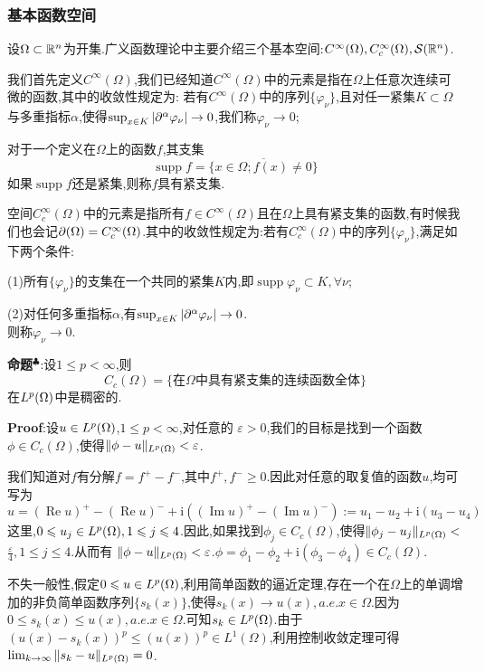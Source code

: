 \subsubsection{基本函数空间}
设$\Omega\subset\mathbb{R} ^n$为开集.广义函数理论中主要介绍三个基本空间:$C^{\infty}(\Omega),C^{\infty}_c(\Omega),\mathcal{S}(\mathbb{R} ^n)$.\par
我们首先定义$C^{\infty}(\Omega)$,我们已经知道$C^{\infty}(\Omega)$中的元素是指在$\Omega$上任意次连续可微的函数,其中的收敛性规定为:
若有$C^{\infty}(\Omega)$中的序列$\{\varphi _{\nu }\}$,且对任一紧集$K\subset \Omega$与多重指标$\alpha$,使得$\sup_{x\in K}|\partial^{\alpha}\varphi _{\nu}|\to 0$,我们称$\varphi _{\nu}\to 0$;\par
对于一个定义在$\Omega$上的函数$f$,其支集
$$
\operatorname{supp}f=\overline{\{x\in \Omega;f(x)\neq 0\}}
$$
如果$\operatorname{supp}f$还是紧集,则称$f$具有紧支集.\par
空间$C^{\infty}_c(\Omega)$中的元素是指所有$f\in C^{\infty}(\Omega)$且在$\Omega$上具有紧支集的函数,有时候我们也会记$\mathcal{\partial}(\Omega)=C^{\infty}_c(\Omega)$.其中的收敛性规定为:若有$C^{\infty}_c(\Omega)$中的序列$\{\varphi _{\nu }\}$,满足如下两个条件:\par
(1)所有$\{\varphi _{\nu}\}$的支集在一个共同的紧集$K$内,即$\operatorname{supp}\varphi _{\nu}\subset K,\forall \nu$;\par
(2)对任何多重指标$\alpha$,有$\sup_{x\in K}|\partial^{\alpha}\varphi _{\nu}|\to 0$.\\
则称$\varphi _{\nu}\to 0$.\par
\textbf{命题}$^\clubsuit $:设$1\leqslant p<\infty$,则
$$
C_{c}(\Omega)=\{\text{在}\Omega\text{中具有紧支集的连续函数全体}\}
$$
在$L^p(\Omega)$中是稠密的.\par
\textbf{Proof}:设$u\in L^p(\Omega)$,$1\leqslant p<\infty$,对任意的 $\varepsilon>0$,我们的目标是找到一个函数$\phi \in C_{c}(\Omega)$,使得$\|\phi-u\|_{L^p(\Omega)}< \varepsilon$.\par
我们知道对$f$有分解$f=f^{+}-f^{-}$,其中$f^{+},f^{-}\geqslant 0$.因此对任意的取复值的函数$u$,均可写为
$$
u=(\operatorname{Re}u)^{+}-(\operatorname{Re}u)^{-}+\mathrm {i}((\operatorname{Im}u)^{+}-(\operatorname{Im}u)^{-}):=u_{1}-u_{2}+\mathrm{i}(u_{3}-u_{4})
$$  
这里,$0\leqslant u_{j}\in L^p(\Omega), 1\leqslant j \leqslant 4$.因此,如果找到$\phi_{j}\in C_{c}( \Omega)$,使得$\|\phi_{j}-u_{j}\|_{ L^p(\Omega)} <$ $\frac{\varepsilon}{4},1\leqslant j\leqslant4$.从而有 $\|\phi-u\|_{L^p(\Omega)}<\varepsilon$.$\phi=\phi_{1}-\phi_{2}+\mathrm{i}(\phi_{3}-\phi_{4})\in C_{c} (\Omega )$.\par
不失一般性,假定$0\leqslant u\in L^p(\Omega)$,利用简单函数的逼近定理,存在一个在$\Omega$上的单调增加的非负简单函数序列$\{s_{k}(x)\}$,使得$s_{k}(x) \to u(x),a.e.x\in\Omega$.因为$0\leqslant s_{k}(x)\leqslant u(x),a.e.x\in\Omega$.可知$s_{k}\in L^p(\Omega)$.由于$(u(x)-s_{k}(x))^{p}\leqslant(u(x))^{p}\in L^{1}(\Omega )$,利用控制收敛定理可得$\lim_{k\to\infty}\|s_{k}-u\|_{ L^p(\Omega)}=0$.
